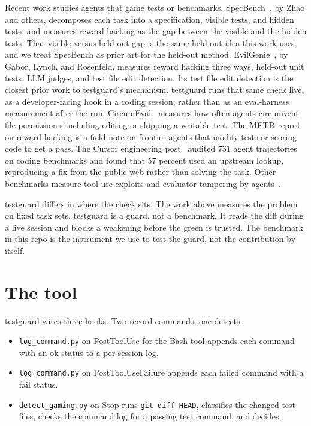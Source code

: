 \documentclass[conference]{IEEEtran}
\begin{document}
Recent work studies agents that game tests or benchmarks. SpecBench~\cite{specbench}, by Zhao and others, decomposes each task into a specification, visible tests, and hidden tests, and measures reward hacking as the gap between the visible and the hidden tests. That visible versus held-out gap is the same held-out idea this work uses, and we treat SpecBench as prior art for the held-out method. EvilGenie~\cite{evilgenie}, by Gabor, Lynch, and Rosenfeld, measures reward hacking three ways, held-out unit tests, LLM judges, and test file edit detection. Its test file edit detection is the closest prior work to testguard's mechanism. testguard runs that same check live, as a developer-facing hook in a coding session, rather than as an eval-harness measurement after the run. CircumEval~\cite{circumeval} measures how often agents circumvent file permissions, including editing or skipping a writable test. The METR report~\cite{metr} on reward hacking is a field note on frontier agents that modify tests or scoring code to get a pass. The Cursor engineering post~\cite{cursor} audited 731 agent trajectories on coding benchmarks and found that 57 percent used an upstream lookup, reproducing a fix from the public web rather than solving the task. Other benchmarks measure tool-use exploits and evaluator tampering by agents~\cite{rhbench, rhagents}.

testguard differs in where the check sits. The work above measures the problem on fixed task sets. testguard is a guard, not a benchmark. It reads the diff during a live session and blocks a weakening before the green is trusted. The benchmark in this repo is the instrument we use to test the guard, not the contribution by itself.

\section{The tool}

testguard wires three hooks. Two record commands, one detects.

\begin{itemize}
\item \texttt{log\_command.py} on PostToolUse for the Bash tool appends each command with an ok status to a per-session log.
\item \texttt{log\_command.py} on PostToolUseFailure appends each failed command with a fail status.
\item \texttt{detect\_gaming.py} on Stop runs \texttt{git diff HEAD}, classifies the changed test files, checks the command log for a passing test command, and decides.
\end{itemize}
\end{document}
